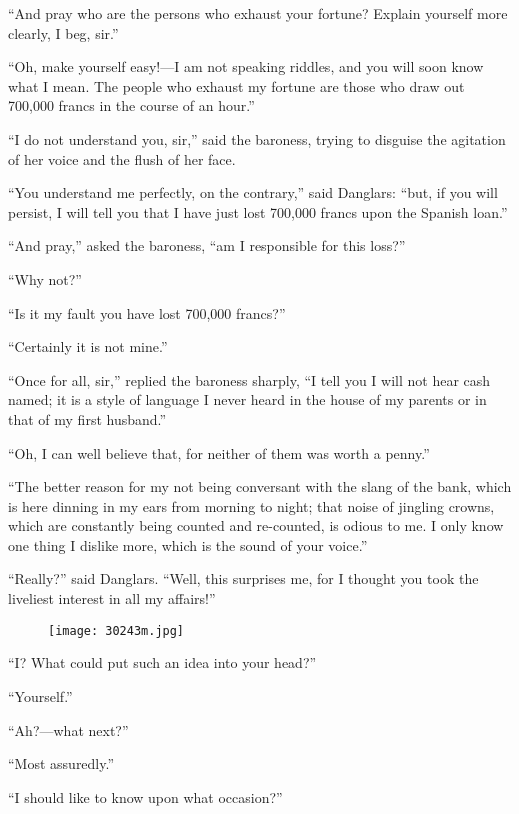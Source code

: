 “And pray who are the persons who exhaust your fortune? Explain
yourself more clearly, I beg, sir.”

“Oh, make yourself easy!—I am not speaking riddles, and you will soon
know what I mean. The people who exhaust my fortune are those who draw
out 700,000 francs in the course of an hour.”

“I do not understand you, sir,” said the baroness, trying to disguise
the agitation of her voice and the flush of her face.

“You understand me perfectly, on the contrary,” said Danglars: “but, if
you will persist, I will tell you that I have just lost 700,000 francs
upon the Spanish loan.”

“And pray,” asked the baroness, “am I responsible for this loss?”

“Why not?”

“Is it my fault you have lost 700,000 francs?”

“Certainly it is not mine.”

“Once for all, sir,” replied the baroness sharply, “I tell you I will
not hear cash named; it is a style of language I never heard in the
house of my parents or in that of my first husband.”

“Oh, I can well believe that, for neither of them was worth a penny.”

“The better reason for my not being conversant with the slang of the
bank, which is here dinning in my ears from morning to night; that
noise of jingling crowns, which are constantly being counted and
re-counted, is odious to me. I only know one thing I dislike more,
which is the sound of your voice.”

“Really?” said Danglars. “Well, this surprises me, for I thought you
took the liveliest interest in all my affairs!”

\begin{figure}[ht]
\texttt{[image: 30243m.jpg]}
\end{figure}

“I? What could put such an idea into your head?”

“Yourself.”

“Ah?—what next?”

“Most assuredly.”

“I should like to know upon what occasion?”

